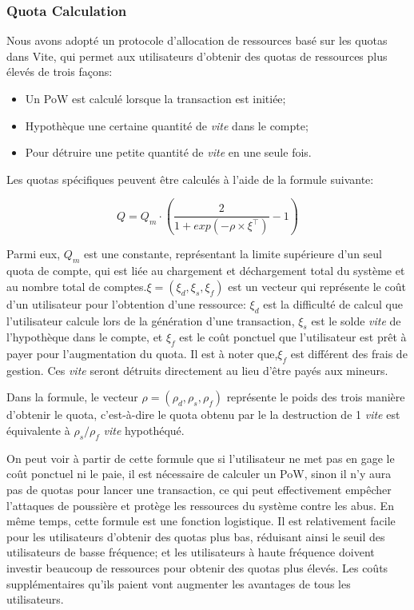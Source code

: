 \documentclass[UTF8,nofonts]{article}
\begin{document}
\begin{multicols}{2}
\subsubsection{Quota Calculation}
Nous avons adopté un protocole d'allocation de ressources basé sur les quotas dans Vite, qui permet aux utilisateurs d'obtenir des quotas de ressources plus élevés de trois façons:
\begin{itemize}
\item Un PoW est calculé lorsque la transaction est initiée;
\item Hypothèque une certaine quantité de \textit{vite} dans le compte;
\item Pour détruire une petite quantité de \textit{vite} en une seule fois.
\end{itemize}

Les quotas spécifiques peuvent être calculés à l'aide de la formule suivante:

\begin{equation}
Q = Q_{m} \cdot \left ( \frac{2}{1+exp\left ( -\rho \times \xi^{\top} \right )} - 1  \right )
\end{equation}

Parmi eux, $Q_{m}$ est une constante, représentant la limite supérieure d'un seul quota de compte, qui est liée au chargement et déchargement total du système et au nombre total de comptes.$\xi=(\xi_{d}, \xi_{s}, \xi_{f})$ est un vecteur qui représente le coût d'un utilisateur pour l'obtention d'une ressource: $\xi_{d}$ est la difficulté de calcul que l'utilisateur calcule lors de la génération d'une transaction, $\xi_{s}$ est le solde \textit{vite} de l'hypothèque dans le compte, et $\xi_{f}$ est le coût ponctuel que l'utilisateur est prêt à payer pour l'augmentation du quota. Il est à noter que,$\xi_{f}$ est différent des frais de gestion. Ces \textit{vite} seront détruits directement au lieu d'être payés aux mineurs.

Dans la formule, le vecteur $\rho=(\rho_{d}, \rho_{s}, \rho_{f})$ représente le poids des trois manière d'obtenir le quota, c'est-à-dire le quota obtenu par le la destruction de 1 \: \textit{vite} est équivalente à $\rho_{s} / \rho_{f}$ \: \textit{vite} hypothéqué.

On peut voir à partir de cette formule que si l'utilisateur ne met pas en gage le coût ponctuel ni le paie, il est nécessaire de calculer un PoW, sinon il n'y aura pas de quotas pour lancer une transaction, ce qui peut effectivement empêcher l'attaques de poussière et protège les ressources du système contre les abus. En même temps, cette formule est une fonction logistique. Il est relativement facile pour les utilisateurs d'obtenir des quotas plus bas, réduisant ainsi le seuil des utilisateurs de basse fréquence; et les utilisateurs à haute fréquence doivent investir beaucoup de ressources pour obtenir des quotas plus élevés. Les coûts supplémentaires qu'ils paient vont augmenter les avantages de tous les utilisateurs.


\end{multicols}
\end{document}
